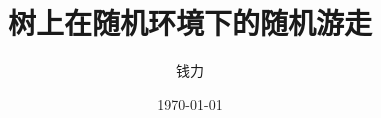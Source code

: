 \documentclass[a4paper,oneside]{ctexbook}
\begin{document}
\title{ \Huge \textbf{树上在随机环境下的随机游走} }
	
\vspace{4em}

\author{钱力}

\date{\today}

\maketitle
\thispagestyle{empty}





 



\cleardoublepage
{}
{}
\tableofcontents
\cleardoublepage

\newtheorem{thm}{定理}[chapter]
\newtheorem{que}[thm]{问题}
\newtheorem{pro}[thm]{命题}
\newtheorem{cor}[thm]{推论}
\newtheorem{defi}[thm]{定义}
\newtheorem{lem}[thm]{引理}
\newtheorem{conjec}[thm]{猜想}
\newtheorem{tri}[thm]{尝试}
\newtheorem{pf}[thm]{证明}



% 
% 
% 
% 
% 
% 


% 






\end{document}
